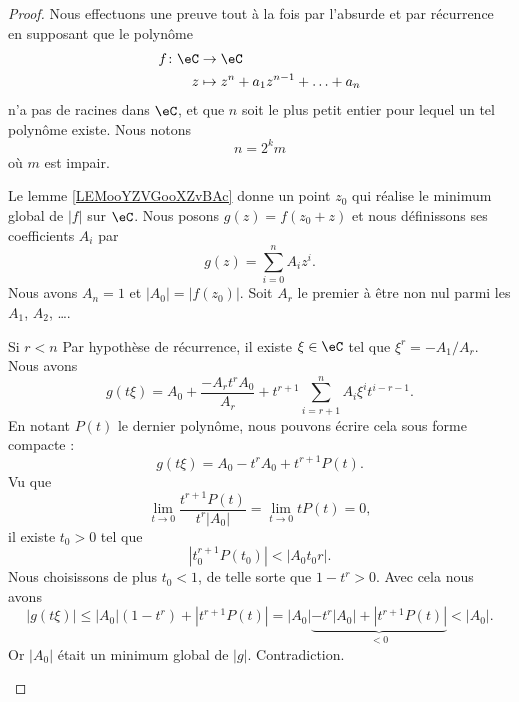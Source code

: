 \begin{proof}
    Nous effectuons une preuve tout à la fois par l'absurde et par récurrence en supposant que le polynôme
    \begin{equation}
        \begin{aligned}
            f\colon \eC&\to \eC \\
            z&\mapsto z^n+a_1z^{n-1}+\ldots+a_n 
        \end{aligned}
    \end{equation}
    n'a pas de racines dans \( \eC\), et que \( n\) soit le plus petit entier pour lequel un tel polynôme existe. Nous notons
    \begin{equation}
        n=2^km
    \end{equation}
    où \( m\) est impair.

    Le lemme \ref{LEMooYZVGooXZvBAc} donne un point \( z_0\) qui réalise le minimum global de \( | f |\) sur $\eC$. Nous posons \( g(z)=f(z_0+z)\) et nous définissons ses coefficients \( A_i\) par
    \begin{equation}
        g(z)=\sum_{i=0}^nA_iz^i.
    \end{equation}
    Nous avons \( A_n=1\) et \( | A_0 |=| f(z_0) |\). Soit \( A_r\) le premier à être non nul parmi les \( A_1\), \( A_2\), \ldots.
    \begin{subproof}
        \item[Si \( r<n\)]
            Par hypothèse de récurrence, il existe \( \xi\in \eC\) tel que \( \xi^r=-A_1/A_r\). Nous avons
            \begin{equation}
                g(t\xi)=A_0+\frac{ -A_rt^rA_0 }{ A_r }+t^{r+1}\sum_{i=r+1}^nA_i\xi^it^{i-r-1}.
            \end{equation}
            En notant \( P(t)\) le dernier polynôme, nous pouvons écrire cela sous forme compacte :
            \begin{equation}
                g(t\xi)=A_0-t^rA_0+t^{r+1}P(t).
            \end{equation}
            Vu que
            \begin{equation}
                \lim_{t\to 0} \frac{ t^{r+1}P(t) }{ t^r| A_0 | }=\lim_{t\to 0} tP(t)=0,
            \end{equation}
            il existe \( t_0>0\) tel que
            \begin{equation}
                | t_0^{r+1}P(t_0) |<| A_0t_0r |.
            \end{equation}
            Nous choisissons de plus \( t_0<1\), de telle sorte que \( 1-t^r>0\). Avec cela nous avons
            \begin{equation}
                | g(t\xi) |\leq | A_0 |(1-t^r)+| t^{r+1}P(t) |=| A_0 |\underbrace{-t^r| A_0 |+| t^{r+1}P(t) |}_{<0}<| A_0 |.
            \end{equation}
            Or \( | A_0 |\) était un minimum global de \( | g |\). Contradiction.


\end{subproof}
\end{proof}
